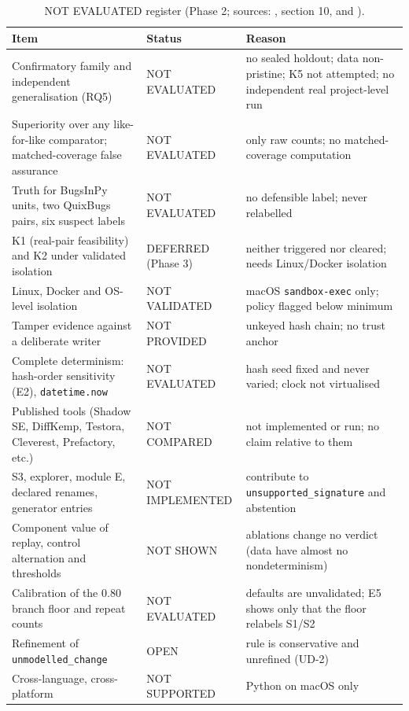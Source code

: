 \begin{table}[t]
\centering\scriptsize
\caption{NOT EVALUATED register (Phase 2; sources: , section 10, and ).}
\label{tab:notevaluated}
\begin{tabular}{p{}p{}p{}}
\hline
Item & Status & Reason \\
\hline
Confirmatory family and independent generalisation (RQ5) & NOT EVALUATED & no sealed holdout; data non-pristine; K5 not attempted; no independent real project-level run \\
Superiority over any like-for-like comparator; matched-coverage false assurance & NOT EVALUATED & only raw counts; no matched-coverage computation \\
Truth for BugsInPy units, two QuixBugs pairs, six suspect labels & NOT EVALUATED & no defensible label; never relabelled \\
K1 (real-pair feasibility) and K2 under validated isolation & DEFERRED (Phase 3) & neither triggered nor cleared; needs Linux/Docker isolation \\
Linux, Docker and OS-level isolation & NOT VALIDATED & macOS \texttt{sandbox-exec} only; policy flagged below minimum \\
Tamper evidence against a deliberate writer & NOT PROVIDED & unkeyed hash chain; no trust anchor \\
Complete determinism: hash-order sensitivity (E2), \texttt{datetime.now} & NOT EVALUATED & hash seed fixed and never varied; clock not virtualised \\
Published tools (Shadow SE, DiffKemp, Testora, Cleverest, Prefactory, etc.) & NOT COMPARED & not implemented or run; no claim relative to them \\
S3, explorer, module E, declared renames, generator entries & NOT IMPLEMENTED & contribute to \texttt{unsupported\_signature} and abstention \\
Component value of replay, control alternation and thresholds & NOT SHOWN & ablations change no verdict (data have almost no nondeterminism) \\
Calibration of the 0.80 branch floor and repeat counts & NOT EVALUATED & defaults are unvalidated; E5 shows only that the floor relabels S1/S2 \\
Refinement of \texttt{unmodelled\_change} & OPEN & rule is conservative and unrefined (UD-2) \\
Cross-language, cross-platform & NOT SUPPORTED & Python on macOS only \\
\hline
\end{tabular}
\end{table}
